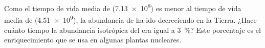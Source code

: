 \documentclass[./../main.tex]{subfiles}
\begin{document}
    \begin{exercise}
        Como el tiempo de vida media de  (\qty{7.13e8}{\years}) es menor al tiempo de vida media de  (\qty{4.51e9}{\years}), la abundancia de  ha ido decreciendo en la Tierra. ¿Hace cuánto tiempo la abundancia isotrópica del  era igual a \SI{3}{\percent}? Este porcentaje es el enriquecimiento que se usa en algunas plantas nucleares.
    \end{exercise}
\end{document}
